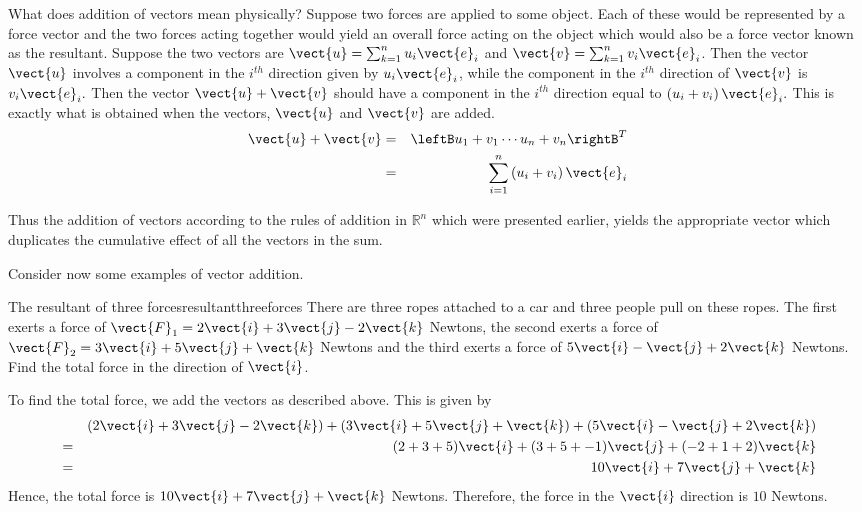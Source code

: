 What does addition of vectors mean physically? Suppose two forces are
applied to some object. Each of these would be represented by a force vector
and the two forces acting together would yield an overall force acting on
the object which would also be a force vector known as the
resultant. Suppose the two vectors are $\vect{u}=\sum_{k=1}^{n}u_{i}\vect{e}_{i}$ and $\vect{v}=\sum_{k=1}^{n}v_{i}\vect{e}_{i}$. Then the vector $\vect{u}$ involves a component in the $
i^{th}$ direction given by $u_{i}\vect{e}_{i}$, while the component in the $i^{th}$
direction of $\vect{v}$ is $v_{i}\vect{e}_{i}.$ Then the vector $\vect{u} + \vect{v}$ should have a component in the $i^{th}$
direction equal to $\left( u_{i}+v_{i}\right) \vect{e}_{i}.$ This is
exactly what is obtained when the vectors, $\vect{u}$ and $\vect{v}$ are
added.
\begin{eqnarray*}
\vect{u}+\vect{v}& =&\leftB u_{1}+v_{1} \cdots u_{n}+v_{n}\rightB^T  \\
& =&\sum_{i=1}^{n}\left( u_{i}+v_{i}\right) \vect{e}_{i}
\end{eqnarray*}

Thus the addition of vectors according to the rules of addition in $\mathbb{R
}^{n}$ which were presented earlier, yields the appropriate vector which
duplicates the cumulative effect of all the vectors in the sum.

Consider now some examples of vector addition.

\begin{example}{The resultant of three forces}{resultantthreeforces}
There are three ropes attached to a car and three people pull on these
ropes. The first exerts a force of $\vect{F}_1 = 
2\vect{i} + 3\vect{j} -2 \vect{k}$ Newtons, the second exerts a force of $\vect{F}_2
=
3\vect{i}+5\vect{j}+\vect{k}$ Newtons
and the third exerts a force of $5\vect{i}-\vect{j}+2\vect{k}$ Newtons. Find
the total force in the direction of $\vect{i}$.
\end{example}

\begin{solution}
To find the total force, we add the vectors as described above. 
This is given by 
\begin{eqnarray*}
&&(2\vect{i}+3\vect{j}-2\vect{k}) + (3\vect{i}+5\vect{j}+\vect{k}) + (5\vect{i}-\vect{j}+2\vect{k})\\
&=&
(2  + 3 + 5) \vect{i} + (3 + 5 + -1) \vect{j} + (-2+1+2) \vect{k} \\
&=&
10 \vect{i} + 7 \vect{j} + \vect{k}
\end{eqnarray*}
Hence, the total force is  $10\vect{i}+7\vect{j}+\vect{k}$ Newtons. Therefore, the force in the $
\vect{i}$ direction is $10$ Newtons.
\end{solution}

